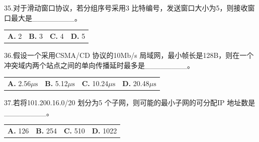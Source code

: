 \documentclass[UTF8,11pt]{ctexart}
\begin{document}
35.对于滑动窗口协议，若分组序号采用3 比特编号，发送窗口大小为5，则接收窗口最大是\_\_\_\_\_\_\_\_。


\begin{center}\begin{tabular}{>{\raggedright\arraybackslash}p{\dimexpr(\linewidth-8\tabcolsep)/4\relax}>{\raggedright\arraybackslash}p{\dimexpr(\linewidth-8\tabcolsep)/4\relax}>{\raggedright\arraybackslash}p{\dimexpr(\linewidth-8\tabcolsep)/4\relax}>{\raggedright\arraybackslash}p{\dimexpr(\linewidth-8\tabcolsep)/4\relax}}
\textbf{A.} 2 & \textbf{B.} 3 & \textbf{C.} 4 & \textbf{D.} 5\\[.35em]\end{tabular}\end{center}

36.假设一个采用CSMA/CD 协议的10Mb/s 局域网，最小帧长是128B，则在一个冲突域内两个站点之间的单向传播延时最多是\_\_\_\_\_\_\_\_。


\begin{center}\begin{tabular}{>{\raggedright\arraybackslash}p{\dimexpr(\linewidth-8\tabcolsep)/4\relax}>{\raggedright\arraybackslash}p{\dimexpr(\linewidth-8\tabcolsep)/4\relax}>{\raggedright\arraybackslash}p{\dimexpr(\linewidth-8\tabcolsep)/4\relax}>{\raggedright\arraybackslash}p{\dimexpr(\linewidth-8\tabcolsep)/4\relax}}
\textbf{A.} 2.\allowbreak{}56\(\displaystyle \mu\mathrm{s}\) & \textbf{B.} 5.\allowbreak{}12\(\displaystyle \mu\mathrm{s}\) & \textbf{C.} 10.\allowbreak{}24\(\displaystyle \mu\mathrm{s}\) & \textbf{D.} 20.\allowbreak{}48\(\displaystyle \mu\mathrm{s}\)\\[.35em]\end{tabular}\end{center}

37.若将101.200.16.0/20 划分为5 个子网，则可能的最小子网的可分配IP 地址数是\_\_\_\_\_\_\_\_。


\begin{center}\begin{tabular}{>{\raggedright\arraybackslash}p{\dimexpr(\linewidth-8\tabcolsep)/4\relax}>{\raggedright\arraybackslash}p{\dimexpr(\linewidth-8\tabcolsep)/4\relax}>{\raggedright\arraybackslash}p{\dimexpr(\linewidth-8\tabcolsep)/4\relax}>{\raggedright\arraybackslash}p{\dimexpr(\linewidth-8\tabcolsep)/4\relax}}
\textbf{A.} 126 & \textbf{B.} 254 & \textbf{C.} 510 & \textbf{D.} 1022\\[.35em]\end{tabular}\end{center}
\end{document}
